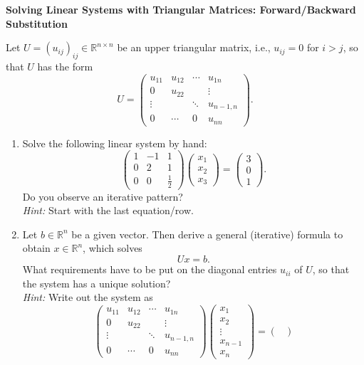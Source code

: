 \textbf{Solving Linear Systems with Triangular Matrices: Forward/Backward Substitution}

Let $U = (u_{ij})_{ij} \in \mathbb{R}^{n \times n}$ be an upper triangular matrix, i.e., $u_{ij} = 0$ for $i > j$, so that $U$ has the form
	$$ U = \begin{pmatrix}
u_{11} & u_{12} & \cdots & u_{1n} \\
0& u_{22} & & \vdots \\
\vdots & & \ddots & u_{n-1,n}\\
0 & \cdots &0 & u_{nn}
\end{pmatrix}.$$
\begin{enumerate}
	\item Solve the following linear system by hand:
		$$\begin{pmatrix}
		1 & -1 & 1	\\
		0 & 2 & 1  \\
		0 & 0 & \frac{1}{2}	
		\end{pmatrix} \begin{pmatrix}
		x_1\\x_2\\x_3
		\end{pmatrix} =
		\begin{pmatrix}
		3\\0\\1
		\end{pmatrix}.$$
		Do you observe an iterative pattern?\\
		\textit{Hint:} Start with the last equation/row.
	\item Let $b \in \mathbb{R}^n$ be a given vector. Then derive a general (iterative) formula to obtain $x \in \mathbb{R}^n $, which solves
	$$Ux = b.$$
	What requirements have to be put on the diagonal entries $u_{ii}$ of $U$, so that the system has a unique solution?\\
	\textit{Hint:} Write out the system as
	$$\begin{pmatrix}
	u_{11} & u_{12} & \cdots & u_{1n} \\
	0& u_{22} & & \vdots \\
	\vdots & & \ddots & u_{n-1,n}\\
	0 & \cdots &0 & u_{nn}
	\end{pmatrix}\begin{pmatrix}
	x_1 \\x_2\\\vdots \\x_{n-1}\\x_n
	\end{pmatrix} = \begin{pmatrix}

\end{pmatrix}$$
\end{enumerate}
